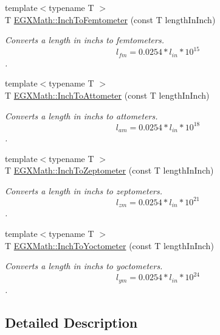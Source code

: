 \begin{DoxyCompactItemize}
{\footnotesize template$<$typename T $>$ }\\T \mbox{\hyperlink{group___e_g_x_math-_conversions-_length_conversions-_imperial-_inch-_s_i_gaef29e83d5736f037b666310a5f08db43}{E\+G\+X\+Math\+::\+Inch\+To\+Femtometer}} (const T length\+In\+Inch)
\begin{DoxyCompactList}\small\item\em Converts a length in inchs to femtometers. \[ l_{fm}=0.0254 * l_{in} * 10^{15} \]. \end{DoxyCompactList}\item 
{\footnotesize template$<$typename T $>$ }\\T \mbox{\hyperlink{group___e_g_x_math-_conversions-_length_conversions-_imperial-_inch-_s_i_ga884865df95828abbf92a65e2ad67538a}{E\+G\+X\+Math\+::\+Inch\+To\+Attometer}} (const T length\+In\+Inch)
\begin{DoxyCompactList}\small\item\em Converts a length in inchs to attometers. \[ l_{am}=0.0254 * l_{in} * 10^{18} \]. \end{DoxyCompactList}\item 
{\footnotesize template$<$typename T $>$ }\\T \mbox{\hyperlink{group___e_g_x_math-_conversions-_length_conversions-_imperial-_inch-_s_i_ga05a90a292ba82b7b777c90c95224c323}{E\+G\+X\+Math\+::\+Inch\+To\+Zeptometer}} (const T length\+In\+Inch)
\begin{DoxyCompactList}\small\item\em Converts a length in inchs to zeptometers. \[ l_{zm}=0.0254 * l_{in} * 10^{21} \]. \end{DoxyCompactList}\item 
{\footnotesize template$<$typename T $>$ }\\T \mbox{\hyperlink{group___e_g_x_math-_conversions-_length_conversions-_imperial-_inch-_s_i_gaa74c358f0539e80771235b9fe0895282}{E\+G\+X\+Math\+::\+Inch\+To\+Yoctometer}} (const T length\+In\+Inch)
\begin{DoxyCompactList}\small\item\em Converts a length in inchs to yoctometers. \[ l_{ym}=0.0254 * l_{in} * 10^{24} \]. \end{DoxyCompactList}\end{DoxyCompactItemize}


\subsection{Detailed Description}


